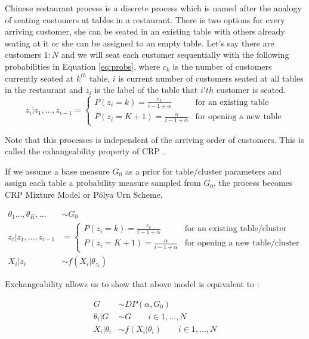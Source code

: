 \documentclass[12pt, a4paper]{article}
\begin{document}
Chinese restaurant process is a discrete process which is named after the
analogy of seating customers at tables in a restaurant. There is two options for every arriving customer, she can be seated in an existing table with others already seating at it or she can be assigned to an empty table. Let's say
there are customers \(1:N\) and we will seat each customer sequentially with the
following probabilities in Equation \ref{eq:probs}, where \(c_k\) is the number of customers currently seated at \(k^{th}\) table, \(i\) is current number of customers seated at all tables in the restaurant and $z_i$ is the label of the table that $i'th$ customer is seated.
\begin{equation}
z_i|z_1,...,z_{i-1} = \begin{cases}
P(z_i=k)=\frac{c_k}{i-1+\alpha} & \text{for an existing table} \\
P(z_i=K+1)=\frac{\alpha}{i-1+\alpha} & \text{for opening a new table}
\end{cases}
\end{equation}\label{eq:probs}

Note that this processes is independent of the arriving order of customers. This is called the exhangeability property of CRP \cite{fang2016dirichlet}.

If we assume a base measure \(G_0\) as a prior for table/cluster
parameters and assign each table a probability measure sampled from
\(G_0\), the process becomes CRP Mixture Model or Pólya Urn Scheme.

\begin{align}
\theta_1...,\theta_K,... &\sim G_0 \\
z_i|z_1,...,z_{i-1} &= \begin{cases}
P(z_i=k)=\frac{c_k}{i-1+\alpha} & \text{for an existing table/cluster} \\
P(z_i=K+1)=\frac{\alpha}{i-1+\alpha} & \text{for opening a new table/cluster}
\end{cases}\\
X_i|z_i &\sim f(X_i|\theta_{z_i})
\end{align}

Exchangeability allows us to show that above model is equivalent to \cite{blackwell1973ferguson}:

\begin{align*}
G &\sim DP(\alpha,G_0)  \\
\theta_i|G &\sim G \qquad i \in 1,...,N \\
X_i|\theta_i &\sim  f(X_i|\theta_i) \qquad i \in 1,...,N \\
\end{align*}
\end{document}

